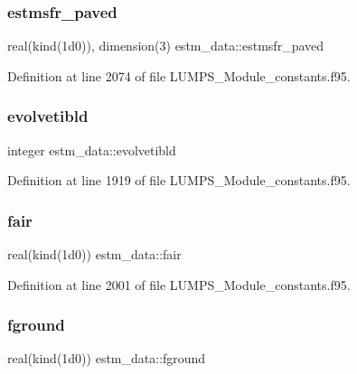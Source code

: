 \subsubsection{\texorpdfstring{estmsfr\+\_\+paved}{estmsfr\_paved}}
{\footnotesize\ttfamily real(kind(1d0)), dimension(3) estm\+\_\+data\+::estmsfr\+\_\+paved}



Definition at line 2074 of file L\+U\+M\+P\+S\+\_\+\+Module\+\_\+constants.\+f95.

\mbox{\label{namespaceestm__data_acff108926dd55ed2574e3a777fa82e03}} 
\subsubsection{\texorpdfstring{evolvetibld}{evolvetibld}}
{\footnotesize\ttfamily integer estm\+\_\+data\+::evolvetibld}



Definition at line 1919 of file L\+U\+M\+P\+S\+\_\+\+Module\+\_\+constants.\+f95.

\mbox{\label{namespaceestm__data_a350989730ec91fcf195ed06a6a7c4fa7}} 
\subsubsection{\texorpdfstring{fair}{fair}}
{\footnotesize\ttfamily real(kind(1d0)) estm\+\_\+data\+::fair}



Definition at line 2001 of file L\+U\+M\+P\+S\+\_\+\+Module\+\_\+constants.\+f95.

\mbox{\label{namespaceestm__data_a9b01f3d94dbedc581011bbcfc3a66f5a}} 
\subsubsection{\texorpdfstring{fground}{fground}}
{\footnotesize\ttfamily real(kind(1d0)) estm\+\_\+data\+::fground}



